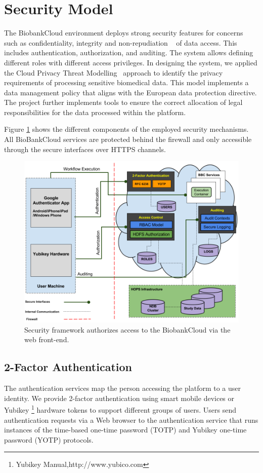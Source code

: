 \section{Security Model}

The BiobankCloud environment deploys strong security features for concerns such as confidentiality, integrity and non-repudiation ~\cite{BBCSEC} of data access. This includes authentication, authorization, and auditing. The system allows defining different roles with different access privileges. In designing the system, we applied the Cloud Privacy Threat Modelling~\cite {CPTM} approach to identify the privacy requirements of processing sensitive biomedical data. This model implements a data management policy that aligns with the European data protection directive. The project further implements tools to ensure the correct allocation of legal responsibilities for the data processed within the platform. 


Figure \ref{fig:security} shows the different components of the employed security mechanisms. All BioBankCloud services are protected behind the firewall and only accessible through the secure interfaces over HTTPS channels.

\begin{figure}[h]
\centering
\includegraphics[width=\textwidth]{./imgs/security.png}
\caption{Security framework authorizes access to the BiobankCloud via the web front-end.}
\label{fig:security}
\end{figure}

\subsection{2-Factor Authentication}
The authentication services map the person accessing the platform to a user identity. We provide 2-factor authentication using smart mobile devices or Yubikey \footnote {Yubikey Manual,http://www.yubico.com} hardware tokens to support different groups of users. Users send authentication requests via a Web browser to the authentication service that runs instances of the time-based one-time password (TOTP) and Yubikey one-time password (YOTP) protocols.


